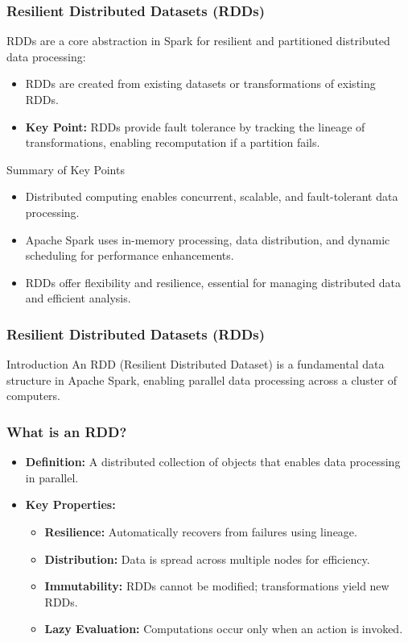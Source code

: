 \documentclass[aspectratio=169]{beamer}
\begin{document}
\begin{frame}[fragile]
    \frametitle{Resilient Distributed Datasets (RDDs)}
    RDDs are a core abstraction in Spark for resilient and partitioned distributed data processing:
    
    \begin{itemize}
        \item RDDs are created from existing datasets or transformations of existing RDDs.
        \item \textbf{Key Point:} RDDs provide fault tolerance by tracking the lineage of transformations, enabling recomputation if a partition fails.
    \end{itemize}
    
    \begin{block}{Summary of Key Points}
        \begin{itemize}
            \item Distributed computing enables concurrent, scalable, and fault-tolerant data processing.
            \item Apache Spark uses in-memory processing, data distribution, and dynamic scheduling for performance enhancements.
            \item RDDs offer flexibility and resilience, essential for managing distributed data and efficient analysis.
        \end{itemize}
    \end{block}
\end{frame}

\begin{frame}[fragile]
    \frametitle{Resilient Distributed Datasets (RDDs)}
    \begin{block}{Introduction}
        An RDD (Resilient Distributed Dataset) is a fundamental data structure in Apache Spark, enabling parallel data processing across a cluster of computers.
    \end{block}
\end{frame}

\begin{frame}[fragile]
    \frametitle{What is an RDD?}
    \begin{itemize}
        \item \textbf{Definition:} A distributed collection of objects that enables data processing in parallel.
        \item \textbf{Key Properties:}
        \begin{itemize}
            \item \textbf{Resilience:} Automatically recovers from failures using lineage.
            \item \textbf{Distribution:} Data is spread across multiple nodes for efficiency.
            \item \textbf{Immutability:} RDDs cannot be modified; transformations yield new RDDs.
            \item \textbf{Lazy Evaluation:} Computations occur only when an action is invoked.
        \end{itemize}
    \end{itemize}
\end{frame}
\end{document}
